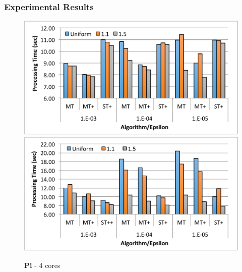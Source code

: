 \documentclass{beamer}
\begin{document}
\begin{frame}
	\frametitle{Experimental Results}
	\begin{figure}[H]\hspace*{-12mm}
			\begin{minipage}[c]{0.7\textwidth}
			\includegraphics[scale=0.47]{main_1_8.pdf}
		\end{minipage}
		\begin{minipage}[c]{0.25\textwidth}  \end{minipage}

		\begin{minipage}[c]{0.7\textwidth}
			\includegraphics[scale=0.45]{main_2_4.pdf}
		\end{minipage}
		\begin{minipage}[c]{0.25\textwidth} {{\bf Pi} - 4 cores} \end{minipage}
		\end{figure}
\end{frame}
\end{document}

